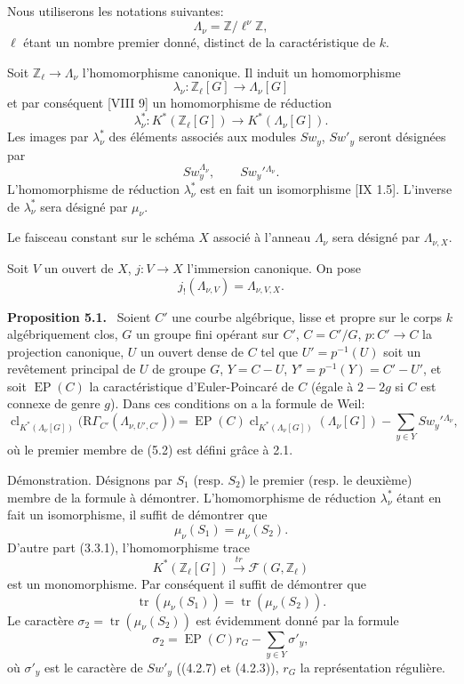 \documentclass[11pt]{article}
\newenvironment{statement}[1]{\par\medskip\noindent\textbf{#1.}\ }{\par\medskip}
\providecommand{\EP}{\operatorname{EP}}
\providecommand{\EP}{\operatorname{EP}}
\providecommand{\clKstar}[1]{\operatorname{cl}_{K^*(#1)}}
\providecommand{\RG}{\mathrm R\Gamma}
\begin{document}
Nous utiliserons les notations suivantes:
\[
\Lambda_\nu=\mathbb Z/\ell^\nu\mathbb Z,
\]
$\ell$ étant un nombre premier donné, distinct de la caractéristique de $k$.

Soit $\mathbb Z_\ell\to\Lambda_\nu$ l'homomorphisme canonique. Il induit un homomorphisme
\[
\lambda_\nu:\mathbb Z_\ell[G]\longrightarrow \Lambda_\nu[G]
\]
et par conséquent [VIII 9] un homomorphisme de réduction
\[
\lambda_\nu^*:K^*(\mathbb Z_\ell[G])\longrightarrow K^*(\Lambda_\nu[G]).
\]
Les images par $\lambda_\nu^*$ des éléments associés aux modules $Sw_y$, $Sw'_y$ seront désignées par
\[
Sw_y^{\Lambda_\nu},\qquad Sw_y'{}^{\Lambda_\nu}.
\]
L'homomorphisme de réduction $\lambda_\nu^*$ est en fait un isomorphisme [IX 1.5]. L'inverse de $\lambda_\nu^*$ sera désigné par $\mu_\nu$.

Le faisceau constant sur le schéma $X$ associé à l'anneau $\Lambda_\nu$ sera désigné par $\Lambda_{\nu,X}$.

Soit $V$ un ouvert de $X$, $j:V\to X$ l'immersion canonique. On pose
\[
j_!(\Lambda_{\nu,V})=\Lambda_{\nu,V,X}.
\]

\begin{statement}{Proposition 5.1}
Soient $C'$ une courbe algébrique, lisse et propre sur le corps $k$ algébriquement clos, $G$ un groupe fini opérant sur $C'$, $C=C'/G$, $p:C'\to C$ la projection canonique, $U$ un ouvert dense de $C$ tel que $U'=p^{-1}(U)$ soit un revêtement principal de $U$ de groupe $G$, $Y=C-U$, $Y'=p^{-1}(Y)=C'-U'$, et soit $\EP(C)$ la caractéristique d'Euler-Poincaré de $C$ (égale à $2-2g$ si $C$ est connexe de genre $g$).
Dans ces conditions on a la formule de Weil:
\[
\clKstar{\Lambda_\nu[G]}\bigl(\RG_{C'}(\Lambda_{\nu,U',C'})\bigr)
=
\EP(C)\clKstar{\Lambda_\nu[G]}(\Lambda_\nu[G])
-\sum_{y\in Y}Sw_y'{}^{\Lambda_\nu},
\tag{5.2}
\]
où le premier membre de (5.2) est défini grâce à 2.1.
\end{statement}

Démonstration. Désignons par $S_1$ (resp. $S_2$) le premier (resp. le deuxième) membre de la formule à démontrer. L'homomorphisme de réduction $\lambda_\nu^*$ étant en fait un isomorphisme, il suffit de démontrer que
\[
\mu_\nu(S_1)=\mu_\nu(S_2).
\]
D'autre part (3.3.1), l'homomorphisme trace
\[
K^*(\mathbb Z_\ell[G])\xrightarrow{\ tr\ }\mathcal F(G,\mathbb Z_\ell)
\]
est un monomorphisme. Par conséquent il suffit de démontrer que
\[
\operatorname{tr}(\mu_\nu(S_1))=\operatorname{tr}(\mu_\nu(S_2)).
\]
Le caractère $\sigma_2=\operatorname{tr}(\mu_\nu(S_2))$ est évidemment donné par la formule
\[
\sigma_2=\EP(C)r_G-\sum_{y\in Y}\sigma'_y,
\tag{5.2.1}
\]
où $\sigma'_y$ est le caractère de $Sw'_y$ ((4.2.7) et (4.2.3)), $r_G$ la représentation régulière.
\end{document}
